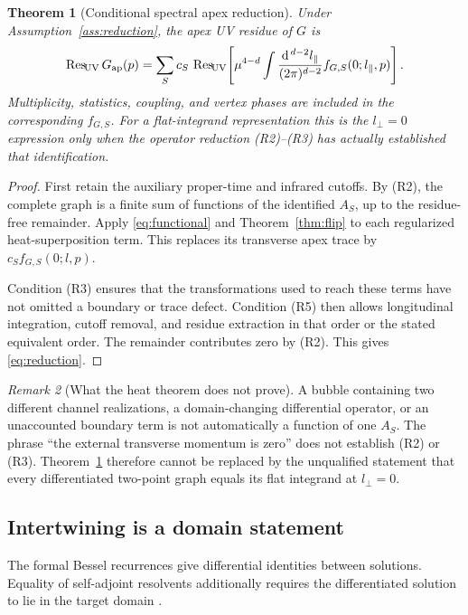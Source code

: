 \documentclass[11pt,a4paper]{article}
\newcommand{\dd}{\mathrm d}
\DeclareMathOperator{\ResUV}{Res_{\!UV}}
\theoremstyle{plain}
\newtheorem{theorem}{Theorem}[section]
\theoremstyle{definition}
\theoremstyle{remark}
\newtheorem{remark}[theorem]{Remark}
\numberwithin{equation}{section}
\begin{document}
\begin{theorem}[Conditional spectral apex reduction]
\label{thm:reduction}
Under Assumption~\ref{ass:reduction}, the apex UV residue of \(G\)
is
\begin{equation}
\ResUV G_{\rm ap}(p)
 =
\sum_S c_S\,
 \ResUV\!
 \left[
 \mu^{4-d}
 \int\frac{\dd^{\,d-2}l_\parallel}{(2\pi)^{d-2}}
 f_{G,S}(0;l_\parallel,p)
 \right].
\label{eq:reduction}
\end{equation}
Multiplicity, statistics, coupling, and vertex phases are included
in the corresponding \(f_{G,S}\).
For a flat-integrand representation this is the
\(l_\perp=0\) expression only when the operator reduction
\textup{(R2)--(R3)} has actually established that identification.
\end{theorem}

\begin{proof}
First retain the auxiliary proper-time and infrared cutoffs.
By (R2), the complete graph is a finite sum of functions of the
identified \(A_S\), up to the residue-free remainder.
Apply \eqref{eq:functional} and Theorem~\ref{thm:flip} to each
regularized heat-superposition term. This replaces its transverse
apex trace by \(c_S f_{G,S}(0;l,p)\).

Condition (R3) ensures that the transformations used to reach
these terms have not omitted a boundary or trace defect.
Condition (R5) then allows longitudinal integration, cutoff removal,
and residue extraction in that order or the stated equivalent
order. The remainder contributes zero by (R2).
This gives \eqref{eq:reduction}.
\end{proof}

\begin{remark}[What the heat theorem does not prove]
A bubble containing two different channel realizations, a
domain-changing differential operator, or an unaccounted boundary
term is not automatically a function of one \(A_S\).
The phrase ``the external transverse momentum is zero'' does not
establish (R2) or (R3).
Theorem~\ref{thm:reduction} therefore cannot be replaced by the
unqualified statement that every differentiated two-point graph
equals its flat integrand at \(l_\perp=0\).
\end{remark}

\subsection{Intertwining is a domain statement}

The formal Bessel recurrences give differential identities between
solutions. Equality of self-adjoint resolvents additionally requires
the differentiated solution to lie in the target domain
\cite{DLMF,DerezinskiRichard}.
\end{document}
